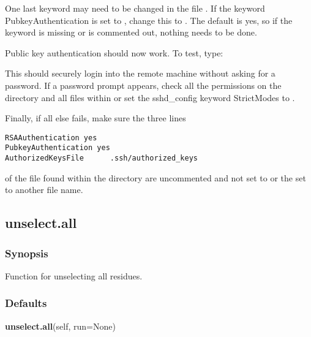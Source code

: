 One last keyword may need to be changed in the file .  If the keyword PubkeyAuthentication is set to , change this to .  The default is yes, so if the keyword is missing or is commented out, nothing needs to be done.


Public key authentication should now work.  To test, type:



This should securely login into the remote machine without asking for a password.  If a password prompt appears, check all the permissions on the directory  and all files within or set the sshd\_config keyword StrictModes to .





Finally, if all else fails, make sure the three lines


{\footnotesize \begin{verbatim}
RSAAuthentication yes
PubkeyAuthentication yes
AuthorizedKeysFile      .ssh/authorized_keys
\end{verbatim}}

of the file  found within the directory  are uncommented and not set to  or the  set to another file name.




\newpage

\subsection{unselect.all}


\subsubsection{Synopsis}

Function for unselecting all residues.



\subsubsection{Defaults}

\textsf{\textbf{unselect.all}(self, run=None)}


